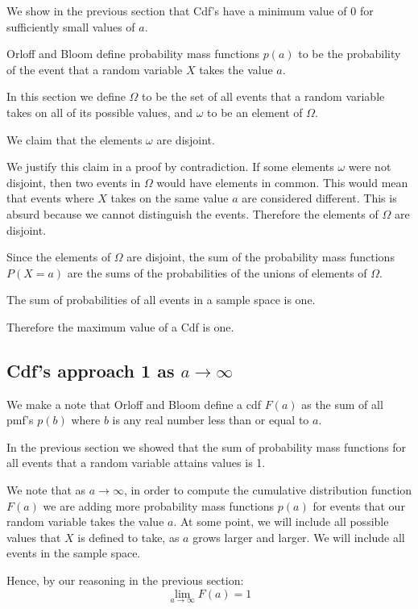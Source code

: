 \documentclass[a4paper,11pt]{article}
\begin{document}
We show in the previous section that Cdf's have a minimum value
of 0 for sufficiently small values of $a$.

Orloff and Bloom define probability mass functions $p \left( a \right)$
to be the probability of the event that a random variable $X$ takes 
the value $a$.

In this section we define $\Omega$ to be the set of all events
that a random variable takes on all of its possible values, and $\omega$
to be an element of $\Omega$.

We claim that the elements $\omega$ are disjoint.

We justify this claim in a proof by contradiction.  
If some elements $\omega$ were not disjoint, then two events in 
$\Omega$ would have elements in common.  This would mean that events
where $X$ takes on the same value $a$ are considered different.  This
is absurd because we cannot distinguish the events.  Therefore the
elements of $\Omega$ are disjoint.

Since the elements of $\Omega$ are disjoint, the sum of the probability
mass functions $P\left( X = a \right)$ are the sums of the probabilities
of the unions of elements of $\Omega$.

The sum of probabilities of all events in a sample space is one.

Therefore the maximum value of a Cdf is one.

\subsection{Cdf's approach 1 as $a \rightarrow \infty$}

We make a note that Orloff and Bloom define a cdf $F\left( a \right)$ 
as the sum of all pmf's $p \left( b \right)$ where $b$ is any real
number less than or equal to $a$.

In the previous section we showed that the sum of probability mass
functions for all events that a random variable attains values
is 1.

We note that as $a \rightarrow \infty$, in order to compute the
cumulative distribution function $F \left( a \right)$ we are adding
more probability mass functions $p \left( a \right)$ for events that
our random variable takes the value $a$.  At some point, we will
include all possible values that $X$ is defined to take, as $a$
grows larger and larger. We will include all events in the sample
space.

Hence, by our reasoning in the previous section:
\begin{equation}
  \lim_{a \rightarrow \infty} F \left( a \right) = 1
\end{equation}
\end{document}
